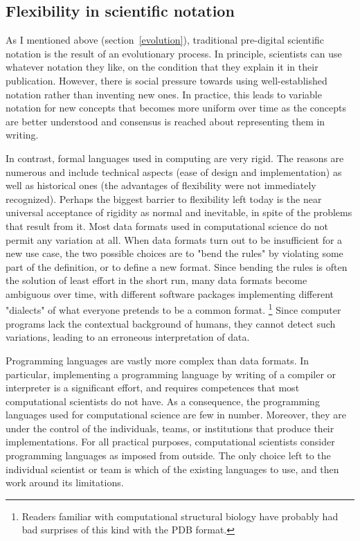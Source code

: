 \subsection{Flexibility in scientific notation}
\label{flexibility}

As I mentioned above (section~\ref{evolution}), traditional pre-digital scientific notation is the result of an evolutionary process. In principle, scientists can use whatever notation they like, on the condition that they explain it in their publication. However, there is social pressure towards using well-established notation rather than inventing new ones. In practice, this leads to variable notation for new concepts that becomes more uniform over time as the concepts are better understood and consensus is reached about representing them in writing.

In contrast, formal languages used in computing are very rigid. The reasons are numerous and include technical aspects (ease of design and implementation) as well as historical ones (the advantages of flexibility were not immediately recognized). Perhaps the biggest barrier to flexibility left today is the near universal acceptance of rigidity as normal and inevitable, in spite of the problems that result from it. Most data formats used in computational science do not permit any variation at all. When data formats turn out to be insufficient for a new use case, the two possible choices are to "bend the rules" by violating some part of the definition, or to define a new format. Since bending the rules is often the solution of least effort in the short run, many data formats become ambiguous over time, with different software packages implementing different "dialects" of what everyone pretends to be a common format. \footnote{Readers familiar with computational structural biology have probably had bad surprises of this kind with the PDB \cite{wwpdb_atomic_2011} format.} Since computer programs lack the contextual background of humans, they cannot detect such variations, leading to an erroneous interpretation of data.

Programming languages are vastly more complex than data formats. In particular, implementing a programming language by writing of a compiler or interpreter is a significant effort, and requires competences that most computational scientists do not have. As a consequence, the programming languages used for computational science are few in number. Moreover, they are under the control of the individuals, teams, or institutions that produce their implementations. For all practical purposes, computational scientists consider programming languages as imposed from outside. The only choice left to the individual scientist or team is which of the existing languages to use, and then work around its limitations.

